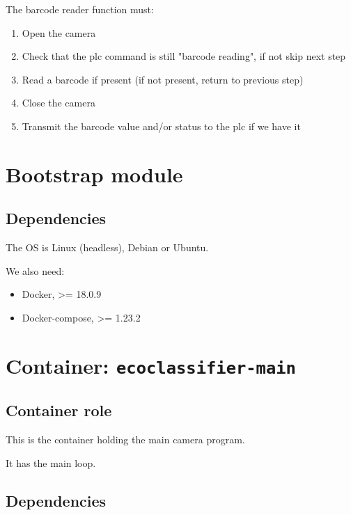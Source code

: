 The barcode reader function must:

\begin{enumerate}
    \item Open the camera
    \item Check that the \gls{plc} command is still "barcode reading", if not skip next step
    \item Read a barcode if present (if not present, return to previous step)
    \item Close the camera
    \item Transmit the barcode value and/or status to the \gls{plc} if we have it
\end{enumerate}


\section{Bootstrap module}

\subsection{Dependencies}

The OS is Linux (headless), Debian or Ubuntu.


We also need:

\begin{itemize}
    \item Docker, >= 18.0.9
    \item Docker-compose, >= 1.23.2
\end{itemize}


\section{Container: \texttt{ecoclassifier-main}}

\subsection{Container role}

This is the container holding the main camera program.

It has the main loop.

\subsection{Dependencies}

